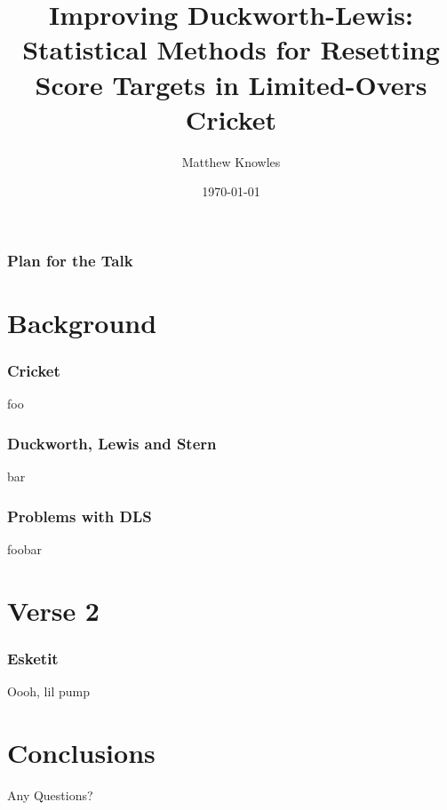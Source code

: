 \documentclass{beamer}
\title[Improving DLS]{Improving Duckworth-Lewis: Statistical Methods for Resetting Score Targets in Limited-Overs Cricket}
\author{Matthew Knowles}
\institute[UoY] 
{
University of York \\ 
\medskip
\textit{mk1320@york.ac.uk} 
}
\date{\today}
\begin{document}
\begin{frame}
\titlepage 
\end{frame}

\begin{frame}
\frametitle{Plan for the Talk} 
\tableofcontents 
\end{frame}

\section{Background}
\begin{frame}
\frametitle{Cricket}
foo
\end{frame}

\begin{frame}
\frametitle{Duckworth, Lewis and Stern}
bar
\end{frame}

\begin{frame}
\frametitle{Problems with DLS}
foobar
    

\end{frame}

\section{Verse 2}
\begin{frame}
\frametitle{Esketit}
Oooh, lil pump
\end{frame}

\section{Conclusions}
\begin{frame}
\Huge{\centerline{Any Questions?}}
\end{frame}
\end{document}
